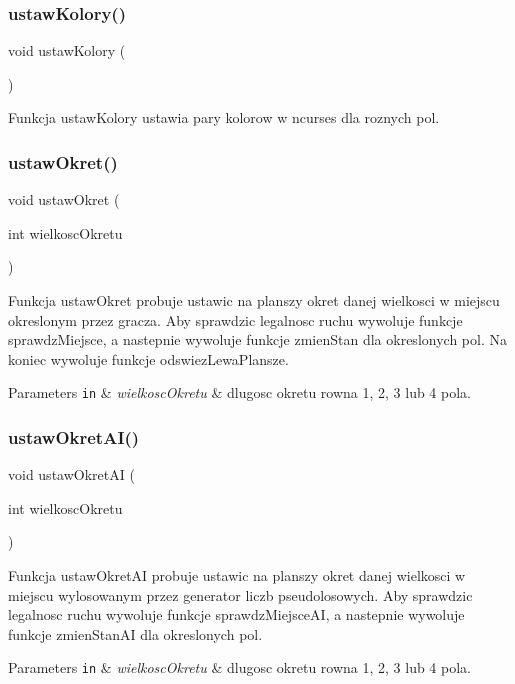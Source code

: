\subsubsection{ustaw\+Kolory()}
{\footnotesize\ttfamily void ustaw\+Kolory (\begin{DoxyParamCaption}{ }\end{DoxyParamCaption})}



Funkcja ustaw\+Kolory ustawia pary kolorow w ncurses dla roznych pol. 

\mbox{\label{znaki_8c_a73db6bc48d8c52e19f67463ae4b6b0e7}} 
\subsubsection{ustaw\+Okret()}
{\footnotesize\ttfamily void ustaw\+Okret (\begin{DoxyParamCaption}\item[{int}]{wielkosc\+Okretu }\end{DoxyParamCaption})}

Funkcja ustaw\+Okret probuje ustawic na planszy okret danej wielkosci w miejscu okreslonym przez gracza. Aby sprawdzic legalnosc ruchu wywoluje funkcje sprawdz\+Miejsce, a nastepnie wywoluje funkcje zmien\+Stan dla okreslonych pol. Na koniec wywoluje funkcje odswiez\+Lewa\+Plansze. 
\begin{DoxyParams}[1]{Parameters}
\mbox{\tt in}  & {\em wielkosc\+Okretu} & dlugosc okretu rowna 1, 2, 3 lub 4 pola. \\
\hline
\end{DoxyParams}
\mbox{\label{znaki_8c_a314ab8e753dc1c989bc9b21668d0bd1f}} 
\subsubsection{ustaw\+Okret\+A\+I()}
{\footnotesize\ttfamily void ustaw\+Okret\+AI (\begin{DoxyParamCaption}\item[{int}]{wielkosc\+Okretu }\end{DoxyParamCaption})}

Funkcja ustaw\+Okret\+AI probuje ustawic na planszy okret danej wielkosci w miejscu wylosowanym przez generator liczb pseudolosowych. Aby sprawdzic legalnosc ruchu wywoluje funkcje sprawdz\+Miejsce\+AI, a nastepnie wywoluje funkcje zmien\+Stan\+AI dla okreslonych pol. 
\begin{DoxyParams}[1]{Parameters}
\mbox{\tt in}  & {\em wielkosc\+Okretu} & dlugosc okretu rowna 1, 2, 3 lub 4 pola. \\
\hline
\end{DoxyParams}
\mbox{\label{znaki_8c_a6769114ed130274a2f47dea12523df77}} 
